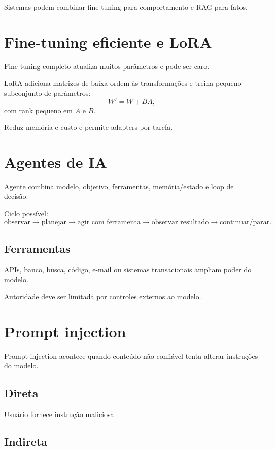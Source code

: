 Sistemas podem combinar fine-tuning para comportamento e RAG para fatos.

\section{Fine-tuning eficiente e LoRA}

Fine-tuning completo atualiza muitos parâmetros e pode ser caro.

LoRA adiciona matrizes de baixa ordem às transformações e treina pequeno subconjunto de parâmetros:
\[
W'=W+BA,
\]
com rank pequeno em $A$ e $B$.

Reduz memória e custo e permite adapters por tarefa.

\section{Agentes de IA}

Agente combina modelo, objetivo, ferramentas, memória/estado e loop de decisão.

Ciclo possível:
\[
\text{observar}\rightarrow
\text{planejar}\rightarrow
\text{agir com ferramenta}\rightarrow
\text{observar resultado}\rightarrow
\text{continuar/parar}.
\]

\subsection{Ferramentas}

APIs, banco, busca, código, e-mail ou sistemas transacionais ampliam poder do modelo.

Autoridade deve ser limitada por controles externos ao modelo.

\section{Prompt injection}

Prompt injection acontece quando conteúdo não confiável tenta alterar instruções do modelo.

\subsection{Direta}

Usuário fornece instrução maliciosa.

\subsection{Indireta}

